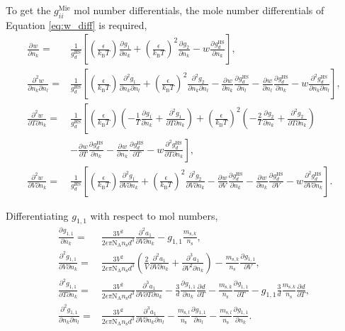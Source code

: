 \documentclass[english]{../thermomemo/thermomemo}
\newcommand*{\pd}[3][]{\frac{\partial^{#1}#2}{\partial{#3}^{#1}}}%
\newcommand*{\pdc}[3]{\frac{\partial^{2}#1}{\partial{#2}\partial{#3}}}%
\newcommand*{\pdcc}[3]{\frac{\partial^{3}#1}{\partial{#2}^{2}\partial{#3}}}%
\newcommand*{\pdth}[4]{\frac{\partial^{3}#1}{\partial{#2}\partial{#3}\partial{#4}}}%
\newcommand*{\lb}{\left(}
\newcommand*{\rb}{\right)}
\newcommand{\mie}{\text{Mie}\xspace}
\newcommand{\hs}{\text{HS}\xspace}
\newcommand{\chain}{\ensuremath{\text{chain}}\xspace}
\newcommand{\seg}{\ensuremath{\text{s}}\xspace}
\newcommand{\kB}{\ensuremath{k_{\text{B}}}\xspace}
\newcommand{\nc}{\ensuremath{\text{N}}\xspace}
\newcommand{\NA}{\ensuremath{\text{N}_{\text{A}}}\xspace}
\begin{document}
To get the $g_{ii}^\mie$ mol number differentials, the mole number
differentials of Equation \ref{eq:w_diff} is required,
\begin{align}
  \label{eq:g_n_diff}
  \pd{w}{n_k} =& \frac{1}{g^\hs_d}\left[\lb \frac{\epsilon}{\kB T} \rb \pd{g_1}{n_k} + \lb \frac{\epsilon}{\kB T} \rb^2 \pd{g_2}{n_k} -w\pd{g^\hs_d}{n_k}\right],\\
  \pdc{w}{n_k}{n_l} =& \frac{1}{g^\hs_d} \left[\lb \frac{\epsilon}{\kB T} \rb \pdc{g_1}{n_k}{n_l} + \lb \frac{\epsilon}{\kB T} \rb^2 \pdc{g_2}{n_k}{n_l} - \pd{w}{n_k}\pd{g^\hs_d}{n_l}  - \pd{w}{n_l}\pd{g^\hs_d}{n_k}  - w\pdc{g^\hs_d}{n_k}{n_l} \right] ,\\
  \pdc{w}{T}{n_k} =& \frac{1}{g^\hs_d}\left[ \lb \frac{\epsilon}{\kB T} \rb \lb -\frac{1}{T}\pd{g_1}{n_k} +  \pdc{g_1}{T}{n_k} \rb + \lb \frac{\epsilon}{\kB T} \rb^2\lb-\frac{2}{T}\pd{g_2}{n_k}  + \pdc{g_2}{T}{n_k}\rb \right. \nonumber \\ &\left. - \pd{w}{T}\pd{g^\hs_d}{n_k} - \pd{w}{n_k}\pd{g^\hs_d}{T} - w\pdc{g^\hs_d}{T}{n_k} \right],\\
  \pdc{w}{V}{n_k} =& \frac{1}{g^\hs_d} \left[\lb \frac{\epsilon}{\kB T} \rb \pdc{g_1}{V}{n_k} + \lb \frac{\epsilon}{\kB T} \rb^2\pdc{g_2}{V}{n_k} - \pd{w}{V}\pd{g^\hs_d}{n_k} - \pd{w}{n_k}\pd{g^\hs_d}{V} - w\pdc{g^\hs_d}{V}{n_k}  \right] .
\end{align}

Differentiating $g_{1,1}$ with respect to mol numbers,
\begin{align}
  \label{eq:g_1_1_diff_n}
  \pd{g_{1,1}}{n_k}  =&  \frac{3 V^2}{2 \epsilon \pi \NA n_\seg  d^3} \pdc{a_1}{V}{n_k} -  g_{1,1} \frac{m_{\seg,k}}{n_\seg},\\
  \pdc{g_{1,1}}{V}{n_k}  =& \frac{3 V^2}{2 \epsilon \pi \NA n_\seg d^3} \lb \frac{2}{V} \pdc{a_1}{V}{n_k} +  \pdcc{a_1}{V}{n_k}\rb  - \frac{m_{\seg,k}}{n_\seg}\pd{g_{1,1}}{V},\\
  \pdc{g_{1,1}}{T}{n_k}  =& \frac{3 V^2}{2 \epsilon \pi \NA n_\seg d^3} \pdth{a_1}{V}{T}{n_k} - \frac{3}{d}\pd{g_{1,1}}{n_k}\pd{d}{T}  - \frac{m_{\seg,k}}{n_\seg}\pd{g_{1,1}}{T} - g_{1,1}\frac{3 }{d}\frac{m_{\seg,k}}{n_\seg}\pd{d}{T},\\
  \pdc{g_{1,1}}{n_k}{n_l}  =& \frac{3 V^2}{2 \epsilon \pi \NA n_\seg d^3} \pdth{a_1}{V}{n_k}{n_l} - \frac{m_{\seg,l}}{n_\seg}\pd{g_{1,1}}{n_l} - \frac{m_{\seg,l}}{n_\seg}\pd{g_{1,1}}{n_k}.
\end{align}
\end{document}
